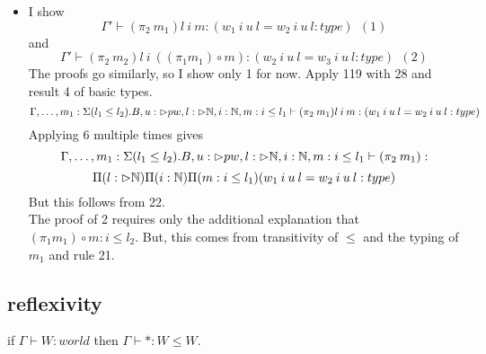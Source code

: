 \message{ !name(paper.tex)}\documentclass{article}
\begin{document}
\begin{itemize}
\begin{itemize}
\item I show  \[\Gamma' \vdash (\pi_2 \: m_1) l \: i \: m : (w_1 \: i \: u \: l = w_2 \: i \: u \: l : type) \:\: (1)\]
    and
    \[\Gamma' \vdash (\pi_2 \: m_2) l \: i \: ((\pi_1 m_1) \circ m): (w_2 \: i \: u \: l = w_3 \: i \: u \: l : type) \:\: (2)\]
    The proofs go similarly, so I show only 1 for now.
    Apply 119 with 28 and result 4 of basic types.
     \[\Gamma, \dots, m_1: \Sigma(l_1 \leq l_2).B, u: \rhd pw, l : \rhd \mathbb{N}, i: \mathbb{N}, m: i \leq l_1 \vdash (\pi_2 \: m_1) l \: i \: m : (w_1 \: i \: u \: l = w_2 \: i \: u \: l : type) \]
     Applying 6 multiple times gives 
       \[\Gamma, \dots, m_1: \Sigma(l_1 \leq l_2).B, u: \rhd pw, l : \rhd \mathbb{N}, i: \mathbb{N}, m: i \leq l_1 \vdash (\pi_2 \: m_1):\]
       \[\Pi(l: \rhd \mathbb{N})\Pi(i: \mathbb{N})\Pi(m: i \leq l_1)(w_1 \: i \: u \: l = w_2 \: i \: u \: l : type) \]
       But this follows from 22.\\
       The proof of 2 requires only the additional explanation that $(\pi_1 m_1) \circ m: i \leq l_2$. But, this comes from transitivity of $\leq$ and the typing of $m_1$ and rule 21.
    \end{itemize}
\end{itemize}

\subsection{reflexivity}
if $\Gamma \vdash W : world$ then $\Gamma \vdash * : W \leq W$.
\end{document}
